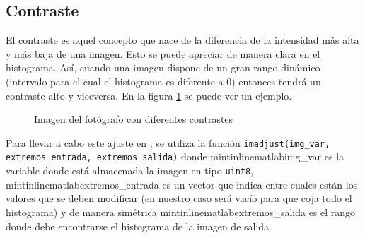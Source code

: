 \documentclass[main]{subfiles}
\begin{document}
\subsection{Contraste}
El contraste es aquel concepto que nace de la diferencia de la intensidad más alta y más baja de una imagen. Esto se puede apreciar de manera clara en el histograma. Así, cuando una imagen dispone de un gran rango dinámico (intervalo para el cual el histograma es diferente a 0) entonces tendrá un contraste alto y viceversa. En la figura \ref{fig:contraste} se puede ver un ejemplo.
\begin{figure}
\centering
    \quad
    \quad
    \caption{Imagen del fotógrafo con diferentes contrastes\label{fig:contraste}}
\end{figure}

Para llevar a cabo este ajuste en \MATLAB, se utiliza la función \texttt{imadjust(img_var, extremos_entrada, extremos_salida)} donde mintinline{matlab}{img_var} es la variable donde está almacenada la imagen en tipo \texttt{uint8}, mintinline{matlab}{extremos_entrada} es un vector que indica entre cuales están los valores que se deben modificar (en nuestro caso será vacío para que coja todo el histograma) y de manera simétrica mintinline{matlab}{extremos_salida} es el rango donde debe encontrarse el histograma de la imagen de salida.
\end{document}
